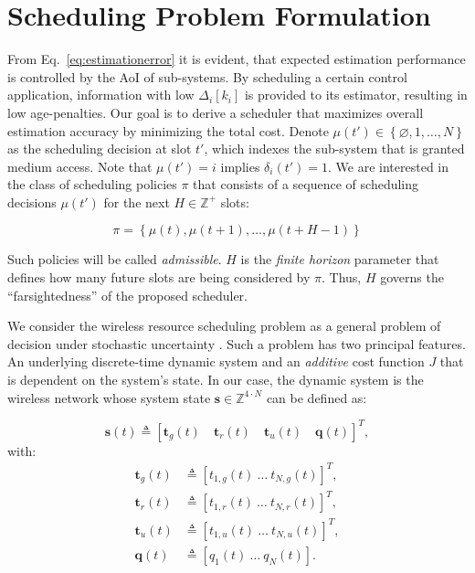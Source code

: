 \section{Scheduling Problem Formulation} \label{sec:problem} 

From Eq.~\eqref{eq:estimationerror} it is evident, that expected estimation
performance is controlled by the AoI of sub-systems. By scheduling a certain
control application, information with low $\Delta_i[k_i]$ is provided to its
estimator, resulting in low age-penalties. Our goal is to derive a scheduler
that maximizes overall estimation accuracy by minimizing the total cost. Denote
$\mu(t')\in\left\{\varnothing, 1, \dots,N \right\}$ as the scheduling decision
at slot $t'$, which indexes the sub-system that is granted medium access. Note
that $\mu(t')=i$ implies $\delta_i(t')=1$. We are interested in the class of
scheduling policies $\pi$ that consists of a sequence of scheduling decisions
$\mu(t')$ for the next $H \in \mathbb{Z}^+$ slots:

\begin{equation}
  \pi=\left\{ \mu(t), \mu(t+1), \dots, \mu(t+H-1) \right\}
\end{equation}

Such policies will be called \textit{admissible}. $H$ is the \textit{finite
horizon} parameter that defines how many future slots are being considered by
$\pi$. Thus, $H$ governs the ``farsightedness'' of the proposed scheduler.

We consider the wireless resource scheduling problem as a general problem of
decision under stochastic uncertainty \cite{bertsekas1995dynamic}. Such a
problem has two principal features. An underlying discrete-time dynamic system
and an \textit{additive} cost function $J$ that is dependent on the system's
state. In our case, the dynamic system is the wireless network whose system
state $\boldsymbol{s} \in \mathbb{Z}^{4\cdot N}$ can be defined as:

\begin{equation}
  \boldsymbol{s}(t) \triangleq \left[\boldsymbol{t}_g(t) \quad \boldsymbol{t}_r(t) \quad \boldsymbol{t}_u(t) \quad \boldsymbol{q}(t)\right]^T, 
\end{equation}   
with: 
\begin{align}
  \boldsymbol{t}_g(t) &\triangleq \left[ t_{1,g}(t) ~ \dots ~ t_{N,g}(t) \right]^T ,\\
  \boldsymbol{t}_r(t) &\triangleq \left[ t_{1,r}(t) ~ \dots ~ t_{N,r}(t) \right]^T ,\\
  \boldsymbol{t}_u(t) &\triangleq \left[ t_{1,u}(t) ~ \dots ~ t_{N,u}(t) \right]^T ,\\
  \boldsymbol{q}(t) &\triangleq \left[ q_1(t) ~ \dots ~ q_N(t) \right].
\end{align}  

